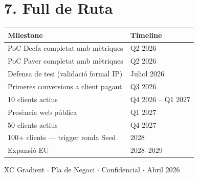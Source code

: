 \documentclass[11pt,a4paper]{article}
\begin{document}
\section{7. Full de Ruta}

\begin{center}
\renewcommand{\arraystretch}{1.3}
\begin{tabularx}{0.92\textwidth}{l X}
\toprule
\textbf{Milestone} & \textbf{Timeline} \\
\midrule
PoC Decfa completat amb mètriques & Q2 2026 \\
PoC Paver completat amb mètriques & Q2 2026 \\
Defensa de tesi (validació formal IP) & Juliol 2026 \\
Primeres conversions a client pagant & Q3 2026 \\
10 clients actius & Q4 2026 -- Q1 2027 \\
Presència web pública & Q1 2027 \\
50 clients actius & Q4 2027 \\
100+ clients --- trigger ronda Seed & 2028 \\
Expansió EU & 2028--2029 \\
\bottomrule
\end{tabularx}
\end{center}

\vfill
\begin{center}
\small\textcolor{midgray}{XC Gradient $\cdot$ Pla de Negoci $\cdot$ Confidencial $\cdot$ Abril 2026}
\end{center}
\end{document}
